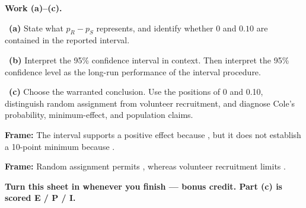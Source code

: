 \documentclass[11pt]{article}
\begin{document}
\newpage
\textbf{Work (a)--(c).}\par\smallskip

~\textbf{(a)} State what $p_R-p_S$ represents, and identify whether $0$ and $0.10$ are contained in the reported interval.\par
\workspace{0.7in}

~\textbf{(b)} Interpret the 95\% confidence interval in context. Then interpret the 95\% confidence level as the long-run performance of the interval procedure.\par
\workspace{1.4in}

~\textbf{(c)} Choose the warranted conclusion. Use the positions of 0 and 0.10, distinguish random assignment from volunteer recruitment, and diagnose Cole's probability, minimum-effect, and population claims.\par
\workspace{2.0in}

\begin{sentenceframebox}\raggedright\textbf{Frame:} The interval supports a positive effect because \blank[1.8in], but it does not establish a 10-point minimum because \blank[2.0in].\end{sentenceframebox}

\begin{sentenceframebox}\raggedright\textbf{Frame:} Random assignment permits \blank[1.5in], whereas volunteer recruitment limits \blank[2.3in].\end{sentenceframebox}

\textbf{Turn this sheet in whenever you finish --- bonus credit. Part (c) is scored E / P / I.}\par
\end{document}
